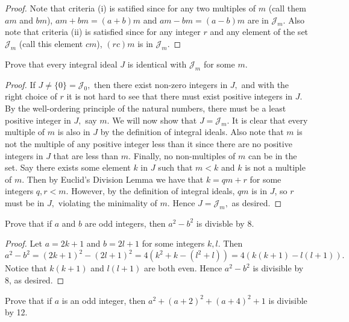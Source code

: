 \documentclass[letterpaper,oneside]{scrartcl}
\begin{document}
\begin{proof}
  Note that criteria (i) is satified since for any two multiples of \(m\) (call them \(am\) and \(bm\)), \(am+bm=(a+b)m\) and \(am-bm=(a-b)m\) are in \(\mathcal{J}_m.\)
  Also note that criteria (ii) is satisfied since for any integer \(r\) and any element of the set \(\mathcal{J}_m\) (call this element \(cm\)), \((rc)m\) is in \(\mathcal{J}_m\).
\end{proof}
\newpage
\begin{problem*}
  Prove that every integral ideal \(J\) is identical with \(\mathcal{J}_m\) for some \(m.\)
\end{problem*}
\begin{proof}
  If \(J\neq\{0\}=\mathcal{J}_0,\) then there exist non-zero integers in \(J,\) and with the right choice of \(r\) it is not hard to see that there must exist positive integers in \(J.\)
  By the well-ordering principle of the natural numbers, there must be a least positive integer in \(J,\) say \(m.\) We will now show that \(J=\mathcal{J}_m.\)
  It is clear that every multiple of \(m\) is also in \(J\) by the definition of integral ideals. Also note that \(m\) is not the multiple of any positive integer less than it since there are no positive integers in \(J\) that are less than \(m.\)
  Finally, no non-multiples of \(m\) can be in the set. Say there exists some element \(k\) in \(J\) such that \(m<k\) and \(k\) is not a multiple of \(m.\) Then by Euclid's Division Lemma we have that \(k=qm+r\) for some integers \(q,r<m.\) However, by the definition of integral ideals, \(qm\) is in \(J\), so \(r\) must be in \(J,\) violating the minimality of \(m.\)
  Hence \(J=\mathcal{J}_m,\) as desired.
\end{proof}
\begin{problem*}
  Prove that if \(a\) and \(b\) are odd integers, then \(a^2-b^2\) is divisble by 8.
\end{problem*}
\begin{proof}
  Let \(a=2k+1\) and \(b=2l+1\) for some integers \(k,l.\) Then
  \[a^2-b^2=(2k+1)^2-(2l+1)^2=4(k^2+k-(l^2+l))=4(k(k+1)-l(l+1)).\]
  Notice that \(k(k+1)\) and \(l(l+1)\) are both even. Hence \(a^2-b^2\) is divisible by 8, as desired.
\end{proof}
\begin{problem*}
  Prove that if \(a\) is an odd integer, then \(a^2+(a+2)^2+(a+4)^2+1\) is divisible by 12.
\end{problem*}
\end{document}
